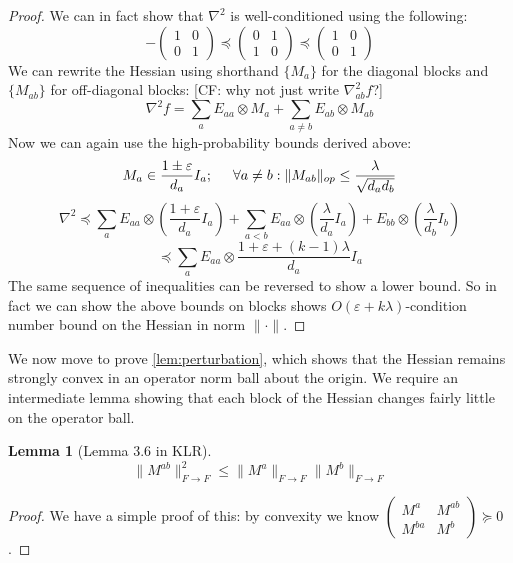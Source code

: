 \documentclass{article}
\newtheorem{lemma}[theorem]{Lemma}
\newcommand\eps{\varepsilon}
\newcommand{\CF}[1]{{\color{purple}[CF: #1]}}
\begin{document}
\begin{proof}
We can in fact show that $\nabla^{2}$ is well-conditioned using the following:
\[ -\begin{pmatrix} 1 & 0 \\ 0 & 1 \end{pmatrix} 
\preceq \begin{pmatrix} 0 & 1 \\ 1 & 0 \end{pmatrix}
\preceq \begin{pmatrix} 1 & 0 \\ 0 & 1 \end{pmatrix}
\]
We can rewrite the Hessian using shorthand $\{M_{a}\}$ for the diagonal blocks and $\{M_{ab}\}$ for off-diagonal blocks: \CF{why not just write $\nabla^2_{ab}f$?}
\[ \nabla^{2} f = \sum_{a} E_{aa} \otimes M_{a} + \sum_{a \neq b} E_{ab} \otimes M_{ab}  \]
Now we can again use the high-probability bounds derived above:
\[ M_{a} \in \frac{1 \pm \eps}{d_{a}} I_{a}; \hspace{5mm} \forall a \neq b: \|M_{ab}\|_{op} \leq \frac{\lambda}{\sqrt{d_{a} d_{b}}}   \]
\[ \nabla^{2} \preceq \sum_{a} E_{aa} \otimes \left( \frac{1+\eps}{d_{a}} I_{a} \right) + \sum_{a < b} E_{aa} \otimes \left( \frac{\lambda}{d_{a}} I_{a} \right) + E_{bb} \otimes \left( \frac{\lambda}{d_{b}} I_{b} \right)    \]
\[ \preceq \sum_{a} E_{aa} \otimes \frac{1+\eps+(k-1)\lambda}{d_{a}} I_{a}  \]
The same sequence of inequalities can be reversed to show a lower bound. So in fact we can show the above bounds on blocks shows $O(\eps + k \lambda)$-condition number bound on the Hessian in norm $\|\cdot\|$. 
\end{proof}
We now move to prove \cref{lem:perturbation}, which shows that the Hessian remains strongly convex in an operator norm ball about the origin. We require an intermediate lemma showing that each block of the Hessian changes fairly little on the operator ball.

\begin{lemma} [Lemma 3.6 in KLR]
\[ \|M^{ab}\|_{F \to F}^{2} \leq \|M^{a}\|_{F \to F} \|M^{b}\|_{F \to F}   \]
\end{lemma}
\begin{proof}
We have a simple proof of this: by convexity we know $\begin{pmatrix} M^{a} & M^{ab} \\ M^{ba} & M^{b}  \end{pmatrix} \succeq 0$. 
\end{proof}
\end{document}
